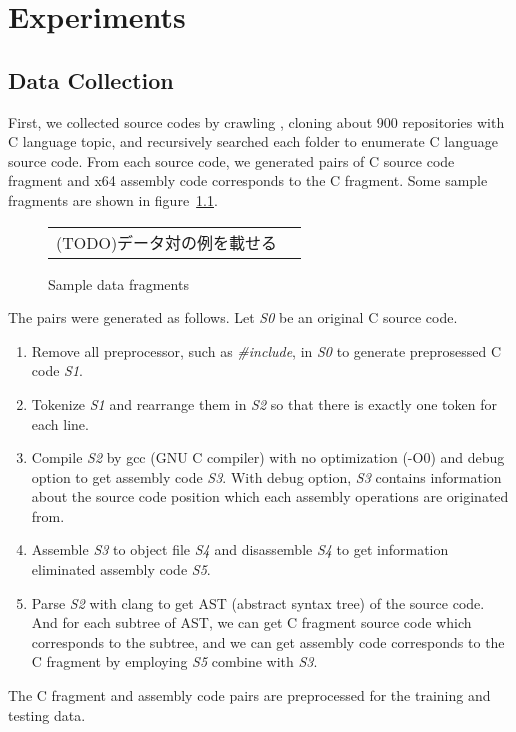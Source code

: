 \documentclass[senior,final,11pt]{iscs-thesis}
\begin{document}
\chapter{Experiments}

\section{Data Collection}
First, we collected source codes by crawling \cite[GitHub]{github}, cloning about 900 repositories with C language topic, 
and recursively searched each folder to enumerate C language source code.
From each source code, we generated pairs of C source code fragment and x64 assembly code corresponds to the C fragment.
Some sample fragments are shown in figure~\ref{fig:pairsoffragments}. 

\begin{figure}
	\begin{tabular}{cc}
		(TODO)データ対の例を載せる
	\end{tabular}
	\caption{Sample data fragments}
	\label{fig:pairsoffragments}
\end{figure}

The pairs were generated as follows. Let {\sl S0} be an original C source code.
\begin{enumerate}
\item Remove all preprocessor, such as {\sl \#include}, in {\sl S0} to generate preprosessed C code {\sl S1}. 
\item Tokenize {\sl S1} and rearrange them in {\sl S2} so that there is exactly one token for each line. 
\item 
Compile {\sl S2} by gcc (GNU C compiler) with no optimization (-O0) and debug option to get assembly code {\sl S3}. 
With debug option, {\sl S3} contains information about the source code position which each assembly operations are originated from.
\item Assemble {\sl S3} to object file {\sl S4} and disassemble {\sl S4} to get information eliminated assembly code {\sl S5}.
\item 
Parse {\sl S2} with clang to get AST (abstract syntax tree) of the source code. 
And for each subtree of AST, we can get C fragment source code which corresponds to the subtree, 
and we can get assembly code corresponds to the C fragment by employing {\sl S5} combine with {\sl S3}.
\end{enumerate}

The C fragment and assembly code pairs are preprocessed for the training and testing data.
\end{document}
